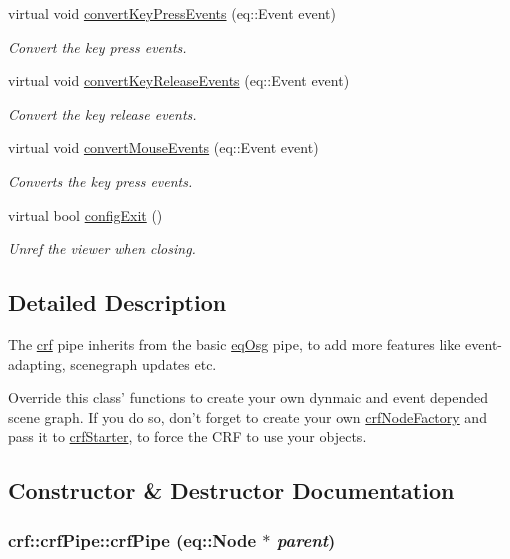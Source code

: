 \begin{CompactItemize}
virtual void \hyperlink{a00006_61564c072f120d8898e57cb268118f9a}{convertKeyPressEvents} (eq::Event event)
\begin{CompactList}\small\item\em Convert the key press events. \item\end{CompactList}\item 
virtual void \hyperlink{a00006_9e4c676e2d880a7149d61c13f2e34f73}{convertKeyReleaseEvents} (eq::Event event)
\begin{CompactList}\small\item\em Convert the key release events. \item\end{CompactList}\item 
virtual void \hyperlink{a00006_bdce51a794891a4b0caa3f33ba6e7ab4}{convertMouseEvents} (eq::Event event)
\begin{CompactList}\small\item\em Converts the key press events. \item\end{CompactList}\item 
virtual bool \hyperlink{a00006_3f48f5f5a8a455342b111f26ca1402db}{configExit} ()
\begin{CompactList}\small\item\em Unref the viewer when closing. \item\end{CompactList}\end{CompactItemize}


\subsection{Detailed Description}
The \hyperlink{a00043}{crf} pipe inherits from the basic \hyperlink{a00045}{eqOsg} pipe, to add more features like event-adapting, scenegraph updates etc. 

Override this class' functions to create your own dynmaic and event depended scene graph. If you do so, don't forget to create your own \hyperlink{a00005}{crfNodeFactory} and pass it to \hyperlink{a00007}{crfStarter}, to force the CRF to use your objects. 

\subsection{Constructor \& Destructor Documentation}
\hypertarget{a00006_0b43238e38fb190f8a5e9a6148950ea0}{
\subsubsection[{crfPipe}]{\setlength{\rightskip}{0pt plus 5cm}crf::crfPipe::crfPipe (eq::Node $\ast$ {\em parent})}}
\label{a00006_0b43238e38fb190f8a5e9a6148950ea0}


